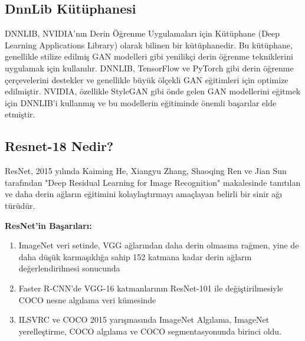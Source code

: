 \documentclass[12pt]{article}
\begin{document}
\subsection{DnnLib Kütüphanesi}
DNNLIB, NVIDIA'nın Derin Öğrenme Uygulamaları için Kütüphane (Deep Learning Applications Library) olarak bilinen bir kütüphanedir. Bu kütüphane, genellikle stilize edilmiş GAN modelleri gibi yenilikçi derin öğrenme tekniklerini uygulamak için kullanılır.
DNNLIB, TensorFlow ve PyTorch gibi derin öğrenme çerçevelerini destekler ve genellikle büyük ölçekli GAN eğitimleri için optimize edilmiştir. NVIDIA, özellikle StyleGAN gibi önde gelen GAN modellerini eğitmek için DNNLIB'i kullanmış ve bu modellerin eğitiminde önemli başarılar elde etmiştir.
\subsection{Resnet-18 Nedir?}
ResNet, 2015 yılında Kaiming He, Xiangyu Zhang, Shaoqing Ren ve Jian Sun tarafından "Deep Residual Learning for Image Recognition" makalesinde tanıtılan ve daha derin ağların eğitimini kolaylaştırmayı amaçlayan belirli bir sinir ağı türüdür. 

\textbf{ResNet'in Başarıları:}

\begin{enumerate}
    \item ImageNet veri setinde, VGG ağlarından daha derin olmasına rağmen, yine de daha düşük karmaşıklığa sahip 152 katmana kadar derin ağların değerlendirilmesi sonucunda %
    \item Faster R-CNN'de VGG-16 katmanlarının ResNet-101 ile değiştirilmesiyle COCO nesne algılama veri kümesinde %
    \item ILSVRC ve COCO 2015 yarışmasında ImageNet Algılama, ImageNet yerelleştirme, COCO algılama ve COCO segmentasyonunda birinci oldu.
\end{enumerate}
\end{document}
